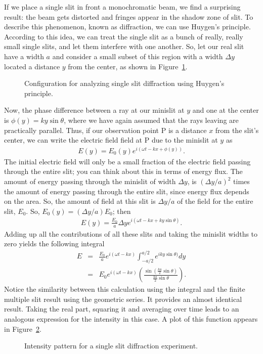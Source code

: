 If we place a single slit in front a monochromatic beam, we find a surprising
result: the beam gets distorted and fringes appear in the shadow zone of slit.
To describe this phenomenon, known as diffraction, we can use Huygen's 
principle. According to this idea, we can treat the single slit as a bunch of
really, really small single slits, and let them interfere with one another. So,
let our real slit have a width $a$ and consider a small subset of this region
with a width $\Delta y$ located a distance $y$ from the center, as shown in 
Figure~\ref{fig:diff:single slit diffraction}.
\begin{figure}[htb]
\centerline{\epsfxsize=10cm }
\caption{Configuration for analyzing single slit diffraction using Huygen's
principle.}
\label{fig:diff:single slit diffraction}
\end{figure}
Now, the phase difference between a ray at  our minislit at $y$ and one at
the center is $\phi(y)  = k y \sin \theta$, where we have again 
assumed that the rays leaving are practically parallel. Thus, if our 
observation point P is a distance $x$ from the slit's center, we can write
the electric field field at P due to the minislit at $y$ as
\begin{eqnarray*}
E(y) = E_0(y) e^{i(\omega t - k x + \phi(y))}.
\end{eqnarray*}
The initial electric field will only be a small fraction of the electric field 
passing through the entire slit; you can think about this in terms of energy 
flux. The amount of energy passing through the minislit of width $\Delta y$, 
is $\left( \Delta y/a \right)^2$ times the amount of energy passing through 
the entire slit, since energy flux depends on the area. So, the amount of 
field at this slit is $\Delta y / a$ of the field for the entire slit, $E_0$. 
So, $E_0(y) = (\Delta y/a) E_0$; then
\begin{eqnarray*}
E(y) = \frac{E_0}{a} \Delta y e^{i(\omega t - k x + k y \sin \theta)}.
\end{eqnarray*}
Adding up all the contributions of all these slits and taking the minislit
widths to zero yields the following integral
\begin{eqnarray*}
E & = & \frac{E_0}{a} e^{i(\omega t - k x)} \int^{a/2}_{-a/2} e^{iky \sin 
\theta)} dy\\
& = & E_0 e^{i(\omega t - k x)} \left(  \frac{\sin ( \frac{ka}{2}
\sin \theta )}{\frac{ka}{2} \sin \theta} \right).
\end{eqnarray*}
Notice the similarity between this calculation using the integral and the 
finite multiple slit result using the geometric series. It provides an almost 
identical result. Taking the real part, squaring it and averaging over time 
leads to an analogous expression for the intensity in this case. A plot of this
function appears in Figure~\ref{fig:diff:single slit diffraction intensity}.\\
\begin{figure}[htb]
\centerline{\epsfxsize=11cm }
\caption{Intensity pattern for a single slit diffraction experiment.}
\label{fig:diff:single slit diffraction intensity}
\end{figure}

